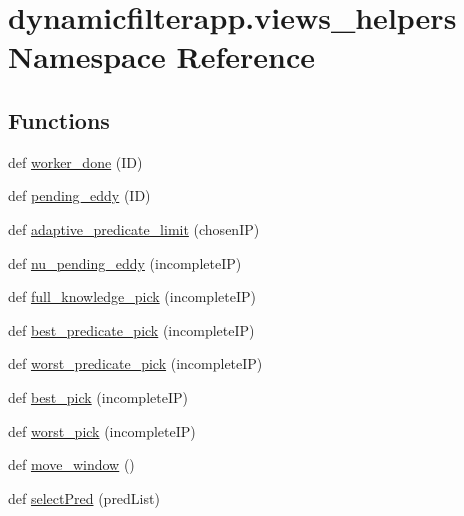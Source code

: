 \hypertarget{namespacedynamicfilterapp_1_1views__helpers}{}\section{dynamicfilterapp.\+views\+\_\+helpers Namespace Reference}
\label{namespacedynamicfilterapp_1_1views__helpers}
\subsection*{Functions}
\begin{DoxyCompactItemize}
\item 
def \mbox{\hyperlink{namespacedynamicfilterapp_1_1views__helpers_af27860dfe5bfa6b2b8a1b29347eb918d}{worker\+\_\+done}} (ID)
\item 
def \mbox{\hyperlink{namespacedynamicfilterapp_1_1views__helpers_a997e8cb3795ce79c24f95bec20063b13}{pending\+\_\+eddy}} (ID)
\item 
def \mbox{\hyperlink{namespacedynamicfilterapp_1_1views__helpers_ac0d019064d0a4dff3cd08f7ea4c4d560}{adaptive\+\_\+predicate\+\_\+limit}} (chosen\+IP)
\item 
def \mbox{\hyperlink{namespacedynamicfilterapp_1_1views__helpers_ad0e707d8ab5c6b57d4307a9b780a599d}{nu\+\_\+pending\+\_\+eddy}} (incomplete\+IP)
\item 
def \mbox{\hyperlink{namespacedynamicfilterapp_1_1views__helpers_a19a0b5e8e5ce5def8165fcd0558ca88d}{full\+\_\+knowledge\+\_\+pick}} (incomplete\+IP)
\item 
def \mbox{\hyperlink{namespacedynamicfilterapp_1_1views__helpers_a6f82774700f533bb63a288a3949ee0d8}{best\+\_\+predicate\+\_\+pick}} (incomplete\+IP)
\item 
def \mbox{\hyperlink{namespacedynamicfilterapp_1_1views__helpers_a0fc083f3d6a368a4f543011330fff151}{worst\+\_\+predicate\+\_\+pick}} (incomplete\+IP)
\item 
def \mbox{\hyperlink{namespacedynamicfilterapp_1_1views__helpers_a31c7bc791ed2c2c02c139599e02990ed}{best\+\_\+pick}} (incomplete\+IP)
\item 
def \mbox{\hyperlink{namespacedynamicfilterapp_1_1views__helpers_a9b2092a89d40943b1572b5c8fb873d86}{worst\+\_\+pick}} (incomplete\+IP)
\item 
def \mbox{\hyperlink{namespacedynamicfilterapp_1_1views__helpers_aa0f3d2407bfd2bfc1074a0fb2f82a336}{move\+\_\+window}} ()
\item 
def \mbox{\hyperlink{namespacedynamicfilterapp_1_1views__helpers_a76037300b9b8c326be6d116519d5a8b9}{select\+Pred}} (pred\+List)

\end{DoxyCompactItemize}

